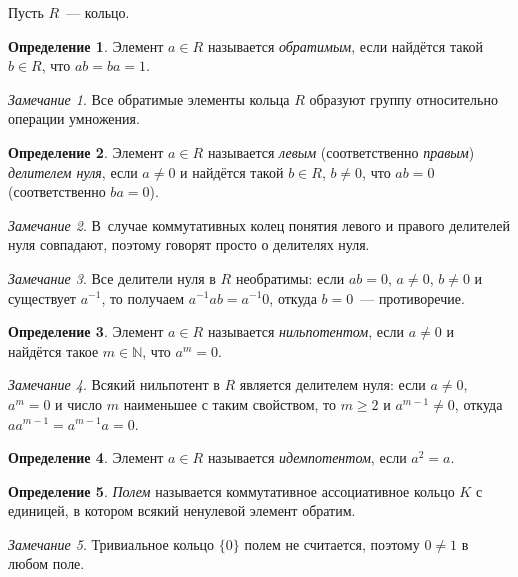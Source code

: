 \documentclass[a4paper,10pt]{amsart}
\def\NN{{\mathbb N}}%
\theoremstyle{definition}
\newtheorem{definition}{Определение}
\theoremstyle{remark}
\newtheorem{remark}{Замечание}
\begin{document}
Пусть $R$~--- кольцо.

\begin{definition}
Элемент $a\in R$ называется {\it обратимым}, если найдётся такой
$b\in R$, что $ab=ba=1$.
\end{definition}

\begin{remark}
Все обратимые элементы кольца $R$ образуют группу относительно
операции умножения.
\end{remark}

\begin{definition}
Элемент $a\in R$ называется \textit{левым} (соответственно
\textit{правым}) \textit{делителем нуля}, если $a \ne 0$ и найдётся
такой $b \in R$, $b\ne 0$, что $ab=0$ (соответственно $ba = 0$).
\end{definition}

\begin{remark}
В~случае коммутативных колец понятия левого и правого делителей нуля
совпадают, поэтому говорят просто о делителях нуля.
\end{remark}

\begin{remark}
Все делители нуля в $R$ необратимы: если $ab = 0$, $a \ne 0$, $b \ne
0$ и существует $a^{-1}$, то получаем $a^{-1}ab = a^{-1}0$, откуда
$b = 0$~--- противоречие.
\end{remark}

\begin{definition}
Элемент $a\in R$ называется {\it нильпотентом}, если $a \ne 0$ и
найдётся такое $m \in \NN$, что $a^m=0$.
\end{definition}

\begin{remark}
Всякий нильпотент в $R$ является делителем нуля: если $a \ne 0$,
$a^m = 0$ и число $m$ наименьшее с таким свойством, то $m \geqslant
2$ и $a^{m-1} \ne 0$, откуда $aa^{m-1} = a^{m-1}a = 0$.
\end{remark}

\begin{definition}
Элемент $a\in R$ называется {\it идемпотентом}, если $a^2=a$.
\end{definition}

\begin{definition}
{\it Полем} называется коммутативное ассоциативное кольцо $K$ с
единицей, в котором всякий ненулевой элемент обратим.
\end{definition}

\begin{remark}
Тривиальное кольцо $\lbrace 0 \rbrace$ полем не считается, поэтому
$0 \ne 1$ в любом поле.
\end{remark}
\end{document}

